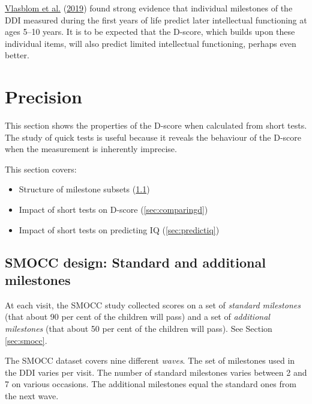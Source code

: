 \documentclass[
]{book}
\providecommand{\tightlist}{%
  \setlength{\itemsep}{0pt}\setlength{\parskip}{0pt}}
\begin{document}
\protect\hyperlink{ref-vlasblom2019}{Vlasblom et al.} (\protect\hyperlink{ref-vlasblom2019}{2019}) found strong evidence that individual milestones of the DDI measured during the first years of life predict later intellectual functioning at ages 5--10 years. It is to be expected that the D-score, which builds upon these individual items, will also predict limited intellectual functioning, perhaps even better.

\hypertarget{ch:precision}{%
\chapter{Precision}\label{ch:precision}}

This section shows the properties of the D-score when calculated from short tests. The study of quick tests is useful because it reveals the behaviour of the D-score when the measurement is inherently imprecise.

This section covers:

\begin{itemize}
\tightlist
\item
  Structure of milestone subsets (\ref{sec:smoccmilestones})
\item
  Impact of short tests on D-score (\ref{sec:comparingd})
\item
  Impact of short tests on predicting IQ (\ref{sec:predictiq})
\end{itemize}

\hypertarget{sec:smoccmilestones}{%
\section{SMOCC design: Standard and additional milestones}\label{sec:smoccmilestones}}

At each visit, the SMOCC study collected scores on a set of \emph{standard milestones} (that about 90 per cent of the children will pass) and a set of \emph{additional milestones} (that about 50 per cent of the children will pass). See Section \ref{sec:smocc}.

The SMOCC dataset covers nine different \emph{waves}. The set of milestones used in the DDI varies per visit. The number of standard milestones varies between 2 and 7 on various occasions. The additional milestones equal the standard ones from the next wave.
\end{document}

